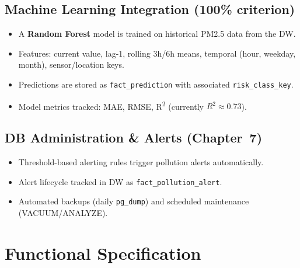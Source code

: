 \documentclass[11pt,a4paper]{article}
\begin{document}
\subsection{Machine Learning Integration (100\% criterion)}

\begin{itemize}[nosep]
  \item A \textbf{Random Forest} model is trained on historical PM2.5 data from the DW.
  \item Features: current value, lag-1, rolling 3h/6h means, temporal (hour, weekday, month), sensor/location keys.
  \item Predictions are stored as \texttt{fact\_prediction} with associated \texttt{risk\_class\_key}.
  \item Model metrics tracked: MAE, RMSE, R\textsuperscript{2} (currently $R^2 \approx 0.73$).
\end{itemize}

\subsection{DB Administration \& Alerts (Chapter~7)}

\begin{itemize}[nosep]
  \item Threshold-based alerting rules trigger pollution alerts automatically.
  \item Alert lifecycle tracked in DW as \texttt{fact\_pollution\_alert}.
  \item Automated backups (daily \texttt{pg\_dump}) and scheduled maintenance (VACUUM/ANALYZE).
\end{itemize}

\section{Functional Specification}
\end{document}
